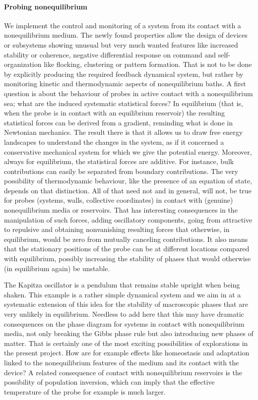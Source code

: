 \paragraph{Probing nonequilibrium}

We implement the control and monitoring of a system from its contact with a nonequilibrium
medium.
%
The newly found properties allow the design of devices or subsystems showing unusual
but very much wanted features like increased stability or coherence, negative differential
response on command and self-organization like flocking, clustering or pattern formation.
%
That is not to be done by explicitly producing the required feedback dynamical system, but
rather by monitoring kinetic and thermodynamic aspects of nonequilibrium baths.
%
A first question is about the behaviour of probes in active contact with a nonequilibrium
sea; what are the induced systematic statistical forces?
%
In equilibrium (that is, when the probe is in contact with an equilibrium reservoir) the
resulting statistical forces can be derived from a gradient, reminding what is done in
Newtonian mechanics.
%
The result there is that it allows us to draw free energy landscapes to understand the
changes in the system, as if it concerned a conservative mechanical system for which we give
the potential energy.
%
Moreover, always for equilibrium, the statistical forces are additive. For instance, bulk
contributions can easily be separated from boundary contributions. The very possibility of
thermodynamic behaviour, like the presence of an equation of state, depends on that
distinction.
%
All of that need not
and in general, will not, be true for probes (systems, walls, collective coordinates) in
contact with (genuine) nonequilibrium media or reservoirs. That has interesting
consequences in the manipulation of such forces, adding oscillatory components, going from
attractive to repulsive and obtaining nonvanishing resulting forces that otherwise, in
equilibrium, would be zero from mutually canceling contributions.  
%
It also means that the stationary positions of the probe can be at different locations
compared with equilibrium, possibly increasing the stability of phases that would otherwise
(in equilibrium again) be unstable.

The Kapitza oscillator is a pendulum that remains stable upright when being shaken. This
example is a rather simple dynamical system and we aim in \TheProject at a systematic
extension of this idea for the stability of macroscopic phases that are very unlikely in
equilibrium.
%
Needless to add here that this may have dramatic consequences on the
phase diagram for systems in contact with nonequilibrium media, not only breaking the Gibbs
phase rule but also introducing new phases of matter.  That is certainly one of the most
exciting possibilities of explorations in the present project. How are for example effects
like homeostasis and adaptation linked to the nonequilibrium features of the medium and its
contact with the device?  A related consequence of contact with nonequilibrium reservoirs is
the possibility of population inversion, which can imply that the effective temperature of
the probe for example is much larger.



